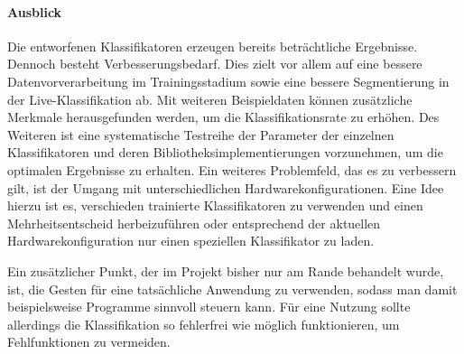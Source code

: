 \paragraph{Ausblick} 
Die entworfenen Klassifikatoren erzeugen bereits beträchtliche Ergebnisse.
Dennoch besteht Verbesserungsbedarf. Dies zielt vor allem auf eine bessere
Datenvorverarbeitung im Trainingsstadium sowie eine bessere Segmentierung in
der Live-Klassifikation ab. Mit weiteren Beispieldaten können zusätzliche Merkmale
herausgefunden werden, um die Klassifikationsrate zu erhöhen. Des Weiteren ist
eine systematische Testreihe der Parameter der einzelnen Klassifikatoren und
deren Bibliotheksimplementierungen vorzunehmen, um die optimalen Ergebnisse zu
erhalten. Ein weiteres Problemfeld, das es zu verbessern gilt, ist der
Umgang mit unterschiedlichen Hardwarekonfigurationen. Eine Idee hierzu ist es,
verschieden trainierte Klassifikatoren zu verwenden und einen Mehrheitsentscheid
herbeizuführen oder entsprechend der aktuellen Hardwarekonfiguration nur einen
speziellen Klassifikator zu laden. 

Ein zusätzlicher Punkt, der im Projekt bisher nur am Rande behandelt wurde, ist,
die Gesten für eine tatsächliche Anwendung zu verwenden, sodass man damit
beispielsweise Programme sinnvoll steuern kann. Für eine Nutzung sollte
allerdings die Klassifikation so fehlerfrei wie möglich funktionieren, um
Fehlfunktionen zu vermeiden.









